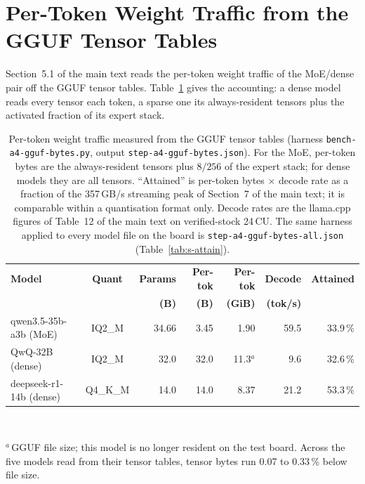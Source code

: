 \documentclass[11pt,a4paper]{article}
\begin{document}
\section{Per-Token Weight Traffic from the GGUF Tensor Tables}

Section~5.1 of the main text reads the per-token weight traffic of the
MoE/dense pair off the GGUF tensor tables.  Table~\ref{tab:s-bytes}
gives the accounting: a dense model reads every tensor each token, a
sparse one its always-resident tensors plus the activated fraction of
its expert stack.

\begin{table}[h]
\centering\small
\caption{Per-token weight traffic measured from the GGUF tensor tables
(harness \texttt{bench-a4-gguf-bytes.py}, output
\texttt{step-a4-gguf-bytes.json}).  For the MoE, per-token bytes are
the always-resident tensors plus $8/256$ of the expert stack; for
dense models they are all tensors.  ``Attained'' is per-token bytes
$\times$ decode rate as a fraction of the 357\,GB/s streaming peak of
Section~7 of the main text; it is comparable within a quantisation
format only.  Decode rates are the llama.cpp figures of Table~12 of
the main text on verified-stock 24\,CU.  The same harness applied to every model file on the board is
\texttt{step-a4-gguf-bytes-all.json} (Table~\ref{tab:s-attain}).}
\label{tab:s-bytes}
\begin{tabular}{@{}lcrrrrr@{}}
\toprule
\textbf{Model} & \textbf{Quant} & \textbf{Params} & \textbf{Per-tok}
  & \textbf{Per-tok} & \textbf{Decode} & \textbf{Attained} \\
 & & \textbf{(B)} & \textbf{(B)} & \textbf{(GiB)} & \textbf{(tok/s)} & \\
\midrule
qwen3.5-35b-a3b (MoE) & IQ2\_M  & 34.66 & 3.45  & 1.90  & 59.5 & 33.9\,\% \\
QwQ-32B (dense)       & IQ2\_M  & 32.0  & 32.0  & 11.3$^{a}$ &  9.6 & 32.6\,\% \\
deepseek-r1-14b (dense) & Q4\_K\_M & 14.0 & 14.0 & 8.37 & 21.2 & 53.3\,\% \\
\bottomrule
\end{tabular}
\\[2pt]
\raggedright\footnotesize $^{a}$\,GGUF file size; this model is no
longer resident on the test board.  Across the five models read from
their tensor tables, tensor bytes run 0.07 to 0.33\,\% below file size.
\end{table}
\end{document}
